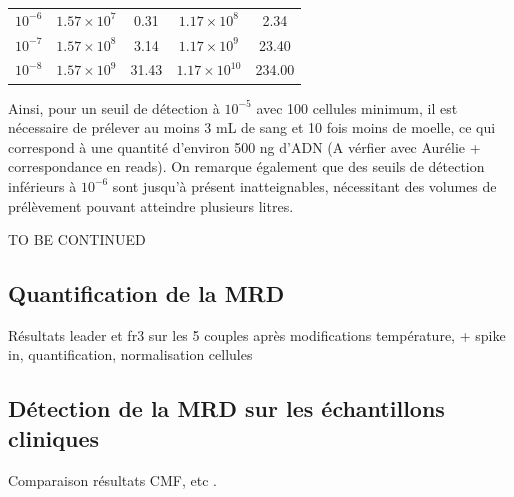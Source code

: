 \begin{table}[H]
\begin{tabular}{c|cc|cc}
        $10^{-6}$            & $1.57 \times 10^{7}$          & \cellcolor{mygreen}0.31       & $1.17 \times 10^{8}$  & \cellcolor{myyellow}2.34     \\
        $10^{-7}$            & $1.57 \times 10^{8}$          & \cellcolor{myyellow}3.14      & $1.17 \times 10^{9}$  & \cellcolor{myorange}23.40    \\
        $10^{-8}$            & $1.57 \times 10^{9}$          & \cellcolor{myred}31.43        & $1.17 \times 10^{10}$ & \cellcolor{mydarkred}234.00  \\
        \bottomrule
    \end{tabular}
\end{table}

Ainsi, pour un seuil de détection à $10^{-5}$ avec 100 cellules minimum, il est
nécessaire de prélever au moins 3 mL de sang et 10 fois moins de moelle, ce qui
correspond à une quantité d'environ 500 ng d'ADN (A vérfier avec Aurélie +
correspondance en reads). On remarque également que des seuils de détection
inférieurs à $10^{-6}$ sont jusqu'à présent inatteignables, nécessitant des
volumes de prélèvement pouvant atteindre plusieurs litres.

TO BE CONTINUED

\subsection{Quantification de la MRD}

Résultats leader et fr3 sur les 5 couples après modifications température, +
spike in, quantification, normalisation cellules

\subsection{Détection de la MRD sur les échantillons cliniques}

Comparaison résultats CMF, etc .